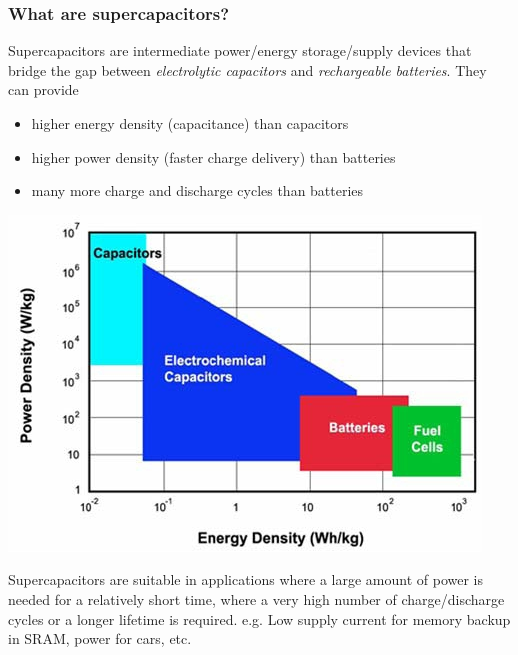 \documentclass[10pt,xcolor=dvipsnames,compress]{beamer}
\begin{document}
\begin{frame}
\frametitle{What are supercapacitors?}
\vfill


Supercapacitors are intermediate power/energy storage/supply devices that bridge the gap between \textit{electrolytic capacitors} and  \textit{rechargeable batteries}. They can provide
\begin{itemize}
\item higher energy density (capacitance) than capacitors
\item higher power density (faster charge delivery) than batteries
\item many more charge and discharge cycles than batteries
\end{itemize}

\begin{center}
\vspace{-0.06in}
\includegraphics[trim = 0mm 0mm 0mm 0mm, clip, width=.48\textwidth]{figs/cap_battery}
\vspace{-0.1in}
\end{center}

\begin{small}
Supercapacitors are suitable in applications where a large amount of power is needed for a relatively
short time, where a very high number of charge/discharge cycles or a longer lifetime is required.
e.g. Low supply current for memory backup in SRAM, power for cars, etc.
\end{small}

\vfill
\end{frame}
\end{document}
